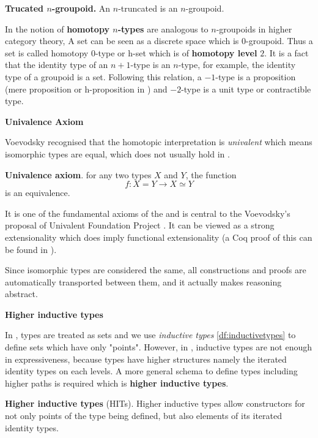\begin{definition}
\textbf{Trucated $n$-groupoid.}
An $n$-truncated \ogs is an $n$-groupoid.
\end{definition}

In \hott the notion of \textbf{homotopy $n$-types} are analogous to $n$-groupoids in higher category theory,
A set can be seen as a discrete space which is $0$-groupoid. Thus a set is called homotopy $0$-type or h-set which is of \textbf{homotopy level} $2$. It is a fact that the identity type of an $n+1$-type is an $n$-type, for example, the identity type of a groupoid is a set. Following this relation, a $-1$-type is a proposition (mere proposition or h-proposition in \hott) and $-2$-type is a unit type or contractible type.

\textbf{Univalence Axiom}

Voevodsky recognised that the homotopic interpretation is \emph{univalent} which means isomorphic types are equal, which does not usually hold in \itt. 

\begin{definition}
\textbf{Univalence axiom}. for any two types $X$ and $Y$, the function 
$$f : X = Y \to X \simeq Y$$ is an equivalence.
\end{definition}

It is one of the fundamental axioms of the \hott and is central to the Voevodsky's proposal of Univalent Foundation Project \cite{vv_uf}. 
It can be viewed as a strong extensionality which does imply functional extensionality (a Coq proof of this can be found in \cite{uafe}). 

Since isomorphic types are considered the same, all constructions and proofs are automatically transported between them, and it actually makes reasoning abstract.


\textbf{Higher inductive types}\label{HITs}

In \itt, types are treated as sets and we use \emph{inductive types} \ref{df:inductivetypes} to define sets which have only "points". However, in \hott, inductive types are not enough in expressiveness, because types have higher structures namely the iterated identity types on each levels.
A more general schema to define types including higher paths is required which is \textbf{higher inductive types}. 

\begin{definition}
\textbf{Higher inductive types} (HITs).
Higher inductive types allow constructors for not only points of the type being defined, but also elements of its iterated identity types.
\end{definition}

